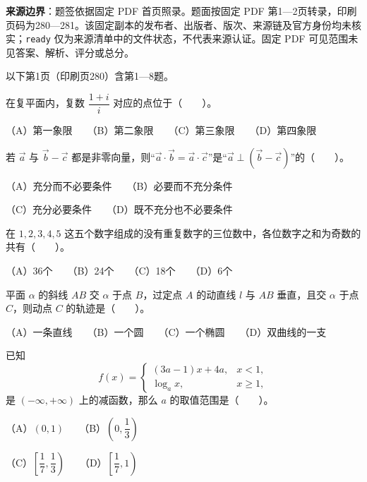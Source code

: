 

\begin{gktip}
\textbf{来源边界}：题签依据固定 PDF 首页照录。题面按固定 PDF 第1—2页转录，印刷页码为280—281。该固定副本的发布者、出版者、版次、来源链及官方身份均未核实；\texttt{ready} 仅为来源清单中的文件状态，不代表来源认证。固定 PDF 可见范围未见答案、解析、评分或总分。
\end{gktip}


\begin{gktip}
以下第1页（印刷页280）含第1—8题。
\end{gktip}

\begin{question}
在复平面内，复数 $\dfrac{1+i}{i}$ 对应的点位于\mbox{（　　）}。

（A）第一象限　　（B）第二象限　　（C）第三象限　　（D）第四象限

\end{question}
\begin{question}
若 $\vec a$ 与 $\vec b-\vec c$ 都是非零向量，则“$\vec a\cdot\vec b=\vec a\cdot\vec c$”是“$\vec a\perp(\vec b-\vec c)$”的\mbox{（　　）}。

（A）充分而不必要条件　　（B）必要而不充分条件

（C）充分必要条件　　（D）既不充分也不必要条件

\end{question}
\begin{question}
在 $1,2,3,4,5$ 这五个数字组成的没有重复数字的三位数中，各位数字之和为奇数的共有\mbox{（　　）}。

（A）36个　　（B）24个　　（C）18个　　（D）6个

\end{question}
\begin{question}
平面 $\alpha$ 的斜线 $AB$ 交 $\alpha$ 于点 $B$，过定点 $A$ 的动直线 $l$ 与 $AB$ 垂直，且交 $\alpha$ 于点 $C$，则动点 $C$ 的轨迹是\mbox{（　　）}。

（A）一条直线　　（B）一个圆　　（C）一个椭圆　　（D）双曲线的一支

\end{question}
\begin{question}
已知
\nopagebreak[4]
\[
f(x)=\begin{cases}
(3a-1)x+4a, & x<1,\\
\log_a x, & x\ge 1,
\end{cases}
\]
是 $(-\infty,+\infty)$ 上的减函数，那么 $a$ 的取值范围是\mbox{（　　）}。

（A）$(0,1)$　　（B）$\left(0,\dfrac13\right)$

（C）$\left[\dfrac17,\dfrac13\right)$　　（D）$\left[\dfrac17,1\right)$

\end{question}
